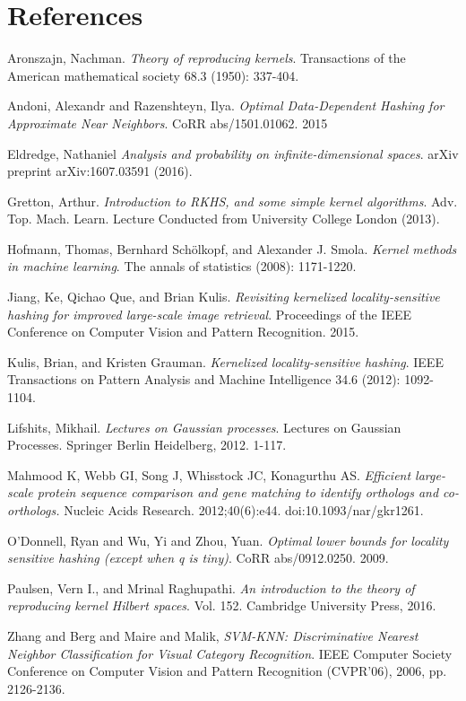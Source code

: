 \documentclass[twoside,11pt]{homework}
\begin{document}
\section*{References}
\beginrefs

 Aronszajn, Nachman. \emph{Theory of reproducing kernels}. Transactions of the American mathematical society 68.3 (1950): 337-404.

 Andoni, Alexandr and Razenshteyn, Ilya. \emph{Optimal Data-Dependent Hashing for Approximate Near Neighbors}. CoRR abs/1501.01062. 2015

 Eldredge, Nathaniel \emph{Analysis and probability on infinite-dimensional spaces}. arXiv preprint arXiv:1607.03591 (2016).

 Gretton, Arthur. \emph{Introduction to RKHS, and some simple kernel algorithms}. Adv. Top. Mach. Learn. Lecture Conducted from University College London (2013).

 Hofmann, Thomas, Bernhard Schölkopf, and Alexander J. Smola. \emph{Kernel methods in machine learning}. The annals of statistics (2008): 1171-1220.

 Jiang, Ke, Qichao Que, and Brian Kulis. \emph{Revisiting kernelized locality-sensitive hashing for improved large-scale image retrieval}. Proceedings of the IEEE Conference on Computer Vision and Pattern Recognition. 2015.
  
 Kulis, Brian, and Kristen Grauman. \emph{Kernelized locality-sensitive hashing}. IEEE Transactions on Pattern Analysis and Machine Intelligence 34.6 (2012): 1092-1104.

 Lifshits, Mikhail. \emph{Lectures on Gaussian processes}. Lectures on Gaussian Processes. Springer Berlin Heidelberg, 2012. 1-117.

 Mahmood K, Webb GI, Song J, Whisstock JC, Konagurthu AS. \emph{Efficient large-scale protein sequence comparison and gene matching to identify orthologs and co-orthologs.} Nucleic Acids Research. 2012;40(6):e44. doi:10.1093/nar/gkr1261.

 O'Donnell, Ryan and Wu, Yi and Zhou, Yuan. \emph{Optimal lower bounds for locality sensitive hashing (except when q is tiny)}. CoRR abs/0912.0250.  2009. 

 Paulsen, Vern I., and Mrinal Raghupathi. \emph{An introduction to the theory of reproducing kernel Hilbert spaces}. Vol. 152. Cambridge University Press, 2016. 

 Zhang and Berg and Maire and Malik, \emph{SVM-KNN: Discriminative Nearest Neighbor Classification for Visual Category Recognition}. IEEE Computer Society Conference on Computer Vision and Pattern Recognition (CVPR'06), 2006, pp. 2126-2136.


\endrefs
\end{document}
